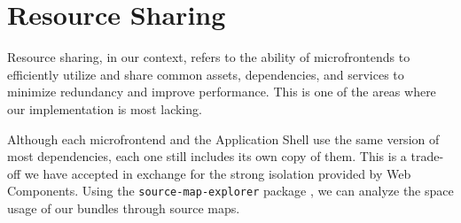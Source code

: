 \section{Resource Sharing}
Resource sharing, in our context, refers to the ability of microfrontends to efficiently utilize and share common assets, dependencies, and services to minimize redundancy and improve performance. This is one of the areas where our implementation is most lacking.

Although each microfrontend and the Application Shell use the same version of most dependencies, each one still includes its own copy of them. This is a trade-off we have accepted in exchange for the strong isolation provided by Web Components. Using the \texttt{source-map-explorer} package \cite{SourceMapExplorer}, we can analyze the space usage of our bundles through source maps.

